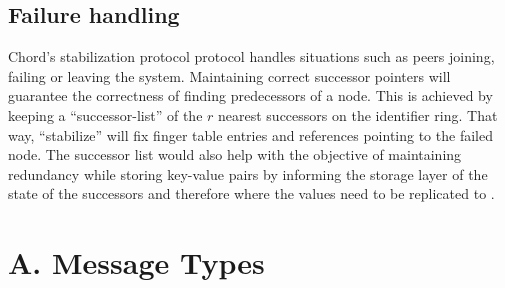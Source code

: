 \documentclass[a4paper, 11pt]{article}
\begin{document}
\subsection*{Failure handling}
Chord's stabilization protocol protocol handles situations such as peers joining, failing or leaving the system. Maintaining correct successor pointers will guarantee the correctness of finding predecessors of a node. This is achieved by keeping a ``successor-list'' of the $r$ nearest successors on the identifier ring. That way, ``stabilize'' will fix finger table entries and references pointing to the failed node. The successor list would also help with the objective of maintaining redundancy while storing key-value pairs by informing the storage layer of the state of the successors and therefore where the values need to be replicated to \cite{Chord}. 





\pagebreak

\section*{A. Message Types}

\end{document}
